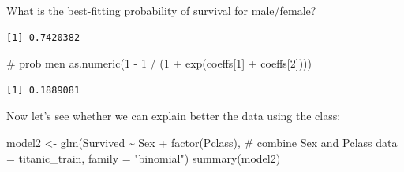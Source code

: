 \documentclass[
  letterpaper,
  DIV=11,
  numbers=noendperiod]{scrreprt}
\newenvironment{Shaded}{\begin{snugshade}}{\end{snugshade}}
\newcommand{\AttributeTok}[1]{\textcolor[rgb]{0.40,0.45,0.13}{#1}}
\newcommand{\CommentTok}[1]{\textcolor[rgb]{0.37,0.37,0.37}{#1}}
\newcommand{\DecValTok}[1]{\textcolor[rgb]{0.68,0.00,0.00}{#1}}
\newcommand{\FunctionTok}[1]{\textcolor[rgb]{0.28,0.35,0.67}{#1}}
\newcommand{\NormalTok}[1]{\textcolor[rgb]{0.00,0.23,0.31}{#1}}
\newcommand{\OtherTok}[1]{\textcolor[rgb]{0.00,0.23,0.31}{#1}}
\newcommand{\SpecialCharTok}[1]{\textcolor[rgb]{0.37,0.37,0.37}{#1}}
\newcommand{\StringTok}[1]{\textcolor[rgb]{0.13,0.47,0.30}{#1}}
\begin{document}
What is the best-fitting probability of survival for male/female?

\begin{Shaded}
\end{Shaded}

\begin{verbatim}
[1] 0.7420382
\end{verbatim}

\begin{Shaded}
\begin{Highlighting}[]
\CommentTok{\# prob men}
\FunctionTok{as.numeric}\NormalTok{(}\DecValTok{1} \SpecialCharTok{{-}} \DecValTok{1} \SpecialCharTok{/}\NormalTok{ (}\DecValTok{1} \SpecialCharTok{+} \FunctionTok{exp}\NormalTok{(coeffs[}\DecValTok{1}\NormalTok{] }\SpecialCharTok{+}\NormalTok{ coeffs[}\DecValTok{2}\NormalTok{])))}
\end{Highlighting}
\end{Shaded}

\begin{verbatim}
[1] 0.1889081
\end{verbatim}

Now let's see whether we can explain better the data using the class:

\begin{Shaded}
\begin{Highlighting}[]
\NormalTok{model2 }\OtherTok{\textless{}{-}} \FunctionTok{glm}\NormalTok{(Survived }\SpecialCharTok{\textasciitilde{}}\NormalTok{ Sex }\SpecialCharTok{+} \FunctionTok{factor}\NormalTok{(Pclass), }\CommentTok{\# combine Sex and Pclass}
              \AttributeTok{data =}\NormalTok{ titanic\_train,}
              \AttributeTok{family =} \StringTok{"binomial"}\NormalTok{)}
\FunctionTok{summary}\NormalTok{(model2)}
\end{Highlighting}
\end{Shaded}
\end{document}
